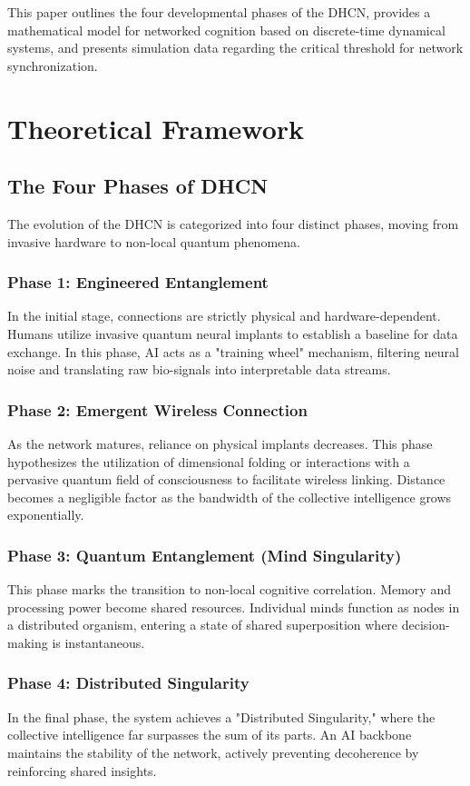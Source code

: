 \documentclass[12pt, letterpaper]{article}
\begin{document}
This paper outlines the four developmental phases of the DHCN, provides a mathematical model for networked cognition based on discrete-time dynamical systems, and presents simulation data regarding the critical threshold for network synchronization.

\section{Theoretical Framework}

\subsection{The Four Phases of DHCN}
The evolution of the DHCN is categorized into four distinct phases, moving from invasive hardware to non-local quantum phenomena.

\subsubsection{Phase 1: Engineered Entanglement}
In the initial stage, connections are strictly physical and hardware-dependent. Humans utilize invasive quantum neural implants to establish a baseline for data exchange. In this phase, AI acts as a "training wheel" mechanism, filtering neural noise and translating raw bio-signals into interpretable data streams.

\subsubsection{Phase 2: Emergent Wireless Connection}
As the network matures, reliance on physical implants decreases. This phase hypothesizes the utilization of dimensional folding or interactions with a pervasive quantum field of consciousness to facilitate wireless linking. Distance becomes a negligible factor as the bandwidth of the collective intelligence grows exponentially.

\subsubsection{Phase 3: Quantum Entanglement (Mind Singularity)}
This phase marks the transition to non-local cognitive correlation. Memory and processing power become shared resources. Individual minds function as nodes in a distributed organism, entering a state of shared superposition where decision-making is instantaneous.

\subsubsection{Phase 4: Distributed Singularity}
In the final phase, the system achieves a "Distributed Singularity," where the collective intelligence far surpasses the sum of its parts. An AI backbone maintains the stability of the network, actively preventing decoherence by reinforcing shared insights.
\end{document}

